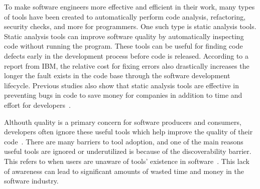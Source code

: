 \documentclass[conference]{IEEEtran}
\begin{document}
To make software engineers more effective and efficient in their work, many types of tools have been created to automatically perform code analysis, refactoring, security checks, and more for programmers. One such type is static analysis tools. Static analysis tools can improve software quality by automatically inspecting code without running the program. These tools can be useful for finding code defects early in the development process before code is released. According to a report from IBM, the relative cost for fixing errors also drastically increases the longer the fault exists in the code base through the software development lifecycle. Previous studies also show that static analysis tools are effective in preventing bugs in code to save money for companies in addition to time and effort for developers~\cite{UsingStaticAnalysis}.

Althouth quality is a primary concern for software producers and consumers, developers often ignore these useful tools which help improve the quality of their code~\cite{Johnson2013Why}. There are many barriers to tool adoption, and one of the main reasons useful tools are ignored or underutilized is because of the discoverability barrier. This refers to when users are unaware of tools' existence in software~\cite{Murphy-HillScreencastingDiscovery}. This lack of awareness can lead to significant amounts of wasted time and money in the software industry.

%
\end{document}
